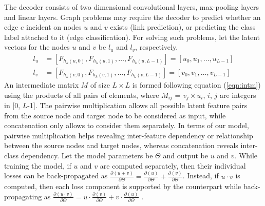 \label{par:decoder}
The decoder consists of two dimensional convolutional layers\cite{fukushima1980neocognitron}, max-pooling layers and linear layers. Graph problems may require the decoder to predict whether an edge $e$ incident on nodes $u$ and $v$ exists (link prediction), or predicting the class label attached to it (edge classification). For solving such problems, let the latent vectors for the nodes $u$ and $v$ be $l_u$ and $l_v$, respectively.
\begin{equation}
\begin{split}
l_u & = \left[ F_{h_k(u,0)},  F_{h_k(u,1)}, \dots ,  F_{h_k(u,L-1)}\right]
= \left[ u_0, u_1, \dots , u_{L-1}\right]\\
l_v & = \left[ F_{h_k(v,0)},  F_{h_k(v,1)}, \dots ,  F_{h_k(v,L-1)}\right]
= \left[ v_0, v_1, \dots , v_{L-1}\right]
\end{split}
\end{equation}
An intermediate matrix $M$ of size $L \times L$ is formed 
following equation (\ref{eqn:intm}) 
using the products of all pairs of elements, where $M_{ij}$ = $v_j \times u_i$, $i$, $j$ are integers in [0, $L$-1]. The pairwise multiplication allows all possible latent feature pairs from the source node and target node to be considered as input, while concatenation only allows to consider them separately. In terms of our model, pairwise multiplication helps revealing inter-feature dependency or relationship between the source nodes and target nodes, whereas concatenation reveals inter-class dependency. 
Let the model parameters be $\Theta$ and output be $u$ and $v$. While training the model, if $u$ and $v$ are computed separately, then their individual losses can be back-propagated as $\frac{\partial \left(u+v\right)}{\partial \Theta}=\frac{\partial \left(u\right)}{\partial \Theta} + \frac{\partial \left(v\right)}{\partial \Theta}$. Instead, if $u\cdot v$ is computed, then each loss component is supported by the counterpart while back-propagating as $\frac{\partial \left(u\cdot v\right)}{\partial \Theta}=u\cdot\frac{\partial \left(v\right)}{\partial \Theta} + v\cdot\frac{\partial \left(u\right)}{\partial \Theta}$ .

\begin{comment}
\begin{equation}
\begin{split}
\frac{\partial \left(u+v\right)}{\partial \Theta}&=\frac{\partial \left(u\right)}{\partial \Theta} + \frac{\partial \left(v\right)}{\partial \Theta}\\
\frac{\partial \left(u\cdot v\right)}{\partial \Theta}&=u\cdot\frac{\partial \left(v\right)}{\partial \Theta} + v\cdot\frac{\partial \left(u\right)}{\partial \Theta}
\end{split}
\label{eqn:partial}
\end{equation}
\end{comment}

